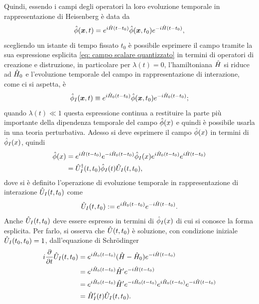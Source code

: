 Quindi, essendo i campi degli operatori la loro evoluzione temporale in rappresentazione di Heisenberg è data da
\begin{equation}
    \hat{\phi}(\bm{x},t) = e^{i\hat{H}(t - t_0)}\hat{\phi}(\bm{x},t_0)e^{-i\hat{H}(t - t_0)},
\end{equation}
scegliendo un istante di tempo fissato $t_0$ è possibile esprimere il campo tramite la sua espressione esplicita \eqref{eq: campo scalare quantizzato} in termini di operatori di creazione e distruzione, in particolare per $\lambda(t) = 0$, l'hamiltoniana $\hat{H}$ si riduce ad $\hat{H}_0$ e l'evoluzione temporale del campo in rappresentazione di interazione, come ci si aspetta, è
\begin{equation}
    \hat{\phi}_I(\bm{x},t) \equiv e^{i\hat{H}_0(t - t_0)}\hat{\phi}(\bm{x},t_0)e^{-i\hat{H}_0(t - t_0)};
\end{equation}
quando $\lambda(t) \ll 1$ questa espressione continua a restituire la parte più importante della dipendenza temporale del campo $\hat{\phi}(x)$ e quindi è possibile usarla in una teoria perturbativa. Adesso si deve esprimere il campo $\hat{\phi}(x)$ in termini di $\hat{\phi}_I(x)$, quindi
\begin{equation}
    \begin{split}
        \hat{\phi}(x) &= e^{i\hat{H}(t - t_0)}e^{-i\hat{H}_0(t - t_0)}\hat{\phi}_I(x)e^{i\hat{H}_0(t - t_0)}e^{i\hat{H}(t - t_0)} \\
        &= \hat{U}^\dagger_I(t,t_0)\hat{\phi}_I(t)\hat{U}_I(t,t_0),
    \end{split}
\end{equation}
dove si è definito l'operazione di evoluzione temporale in rappresentazione di interazione $\hat{U}_I(t,t_0)$ come
\begin{equation}
    \hat{U}_I(t,t_0) := e^{i\hat{H}_0(t - t_0)}e^{-i\hat{H}(t - t_0)}.
\end{equation}
Anche $\hat{U}_I(t,t_0)$ deve essere espresso in termini di $\hat{\phi}_I(x)$ di cui si conosce la forma esplicita. Per farlo, si osserva che $\hat{U}(t,t_0)$ è soluzione, con condizione iniziale $\hat{U}_I(t_0,t_0) = 1$, dall'equazione di Schr\"odinger
\begin{equation}
    \begin{split}
        i\frac{\partial}{\partial t}\hat{U}_I(t,t_0) &= e^{i\hat{H}_0(t - t_0)}(\hat{H} - \hat{H}_0)e^{-i\hat{H}(t-t_0)} \\
        &= e^{i\hat{H}_0(t - t_0)}\hat{H}'e^{-i\hat{H}(t - t_0)} \\
        &= e^{i\hat{H}_0(t - t_0)}\hat{H}'e^{-i\hat{H}_0(t - t_0)}e^{i\hat{H}_0(t - t_0)}e^{-i\hat{H}(t - t_0)} \\
        &= \hat{H}_I'(t)\hat{U}_I(t,t_0).
    \end{split}
\end{equation}
